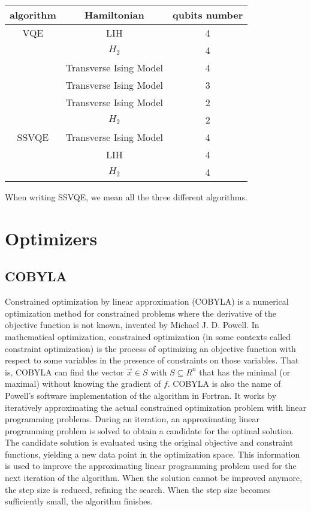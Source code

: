 \documentclass[12pt, a4paper]{article}
\begin{document}
    \begin{center}
        \begin{tabular}{||c c c ||}
            \hline
            algorithm & Hamiltonian & qubits number \\ [0.5ex]
            \hline\hline
            VQE & LIH & 4 \\
            \hline
            & $H_2$ & 4 \\
            \hline
            & Transverse Ising Model & 4 \\
            \hline
            & Transverse Ising Model & 3 \\
            \hline
            & Transverse Ising Model & 2 \\
            \hline
            & $H_2$ & 2 \\
            \hline
            SSVQE & Transverse Ising Model & 4 \\
            \hline
            & LIH & 4 \\
            \hline
            & $H_2$ & 4 \\ \hline
        \end{tabular}
    \end{center}

    When writing SSVQE, we mean all the three different algorithms.\\

    \section{Optimizers}
    \subsection{COBYLA}
    Constrained optimization by linear approximation (COBYLA) is a numerical optimization method for constrained problems where the derivative of the objective function is not known, invented by Michael J. D. Powell.
    In mathematical optimization, constrained optimization (in some contexts called constraint optimization) is the process of optimizing an objective function with respect to some variables in the presence of constraints on those variables.
    That is, COBYLA can find the vector $\Vec{x} \in{S}$
    with $S \subseteq{R^n}$ that has the minimal (or maximal)
    without knowing the gradient of $f$. COBYLA is also the name of Powell's software implementation of the algorithm in Fortran.
    It works by iteratively approximating the actual constrained optimization problem with linear programming problems. During an iteration, an approximating linear programming problem is solved to obtain a candidate for the optimal solution. The candidate solution is evaluated using the original objective and constraint functions, yielding a new data point in the optimization space. This information is used to improve the approximating linear programming problem used for the next iteration of the algorithm. When the solution cannot be improved anymore, the step size is reduced, refining the search. When the step size becomes sufficiently small, the algorithm finishes.
\end{document}
